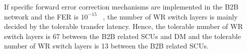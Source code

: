 If specific forward error correction mechanisms are implemented in the B2B network and the FER is $10^{-15}$ ~\cite{prados_white_2011}, the number of WR switch layers is mainly decided by the tolerable transfer latency. Hence, the tolerable number of WR switch layers is 67 between the B2B related \gls{SCU}s and DM and the tolerable number of WR switch layers is 13 between the B2B related \gls{SCU}s.    


